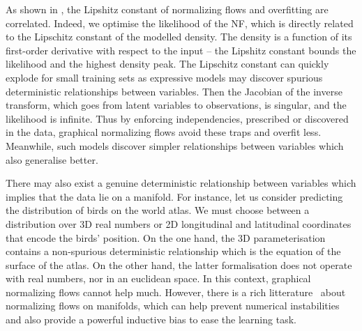 As shown in , the Lipshitz constant of normalizing flows and overfitting are correlated. Indeed, we optimise the likelihood of the NF, which is directly related to the Lipschitz constant of the modelled density. The density is a function of its first-order derivative with respect to the input -- the Lipshitz constant bounds the likelihood and the highest density peak. The Lipschitz constant can quickly explode for small training sets as expressive models may discover spurious deterministic relationships between variables. Then the Jacobian of the inverse transform, which goes from latent variables to observations, is singular, and the likelihood is infinite. Thus by enforcing independencies, prescribed or discovered in the data, graphical normalizing flows avoid these traps and overfit less. Meanwhile, such models discover simpler relationships between variables which also generalise better.

There may also exist a genuine deterministic relationship between variables which implies that the data lie on a manifold. For instance, let us consider predicting the distribution of birds on the world atlas. We must choose between a distribution over 3D real numbers or 2D longitudinal and latitudinal coordinates that encode the birds' position. On the one hand, the 3D parameterisation contains a non-spurious deterministic relationship which is the equation of the surface of the atlas. On the other hand, the latter formalisation does not operate with real numbers, nor in an euclidean space. In this context, graphical normalizing flows cannot help much. However, there is a rich litterature~\citep{kohler2021smooth, mathieu2020riemannian, gemici2016normalizing, kalatzis2021multi, rezende2020normalizing} about normalizing flows on manifolds, which can help prevent numerical instabilities and also provide a powerful inductive bias to ease the learning task.

